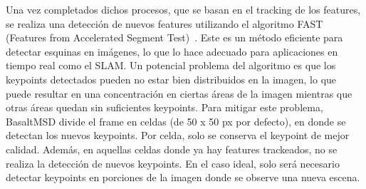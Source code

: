 Una vez completados dichos procesos, que se basan en el tracking de los features, se realiza una detección de nuevos features utilizando el algoritmo FAST (Features from Accelerated Segment Test)~\cite{rosten2006fast}. Este es un método eficiente para detectar esquinas en imágenes, lo que lo hace adecuado para aplicaciones en tiempo real como el SLAM.
Un potencial problema del algoritmo es que los keypoints detectados pueden no estar bien distribuidos en la imagen, lo que puede resultar en una concentración en ciertas áreas de la imagen mientras que otras áreas quedan sin suficientes keypoints. Para mitigar este problema, BasaltMSD divide el frame en celdas (de 50 x 50 px por defecto), en donde se detectan los nuevos keypoints. Por celda, solo se conserva el keypoint de mejor calidad. Además, en aquellas celdas donde ya hay features trackeados, no se realiza la detección de nuevos keypoints. En el caso ideal, solo será necesario detectar keypoints en porciones de la imagen donde se observe una nueva escena.
%

